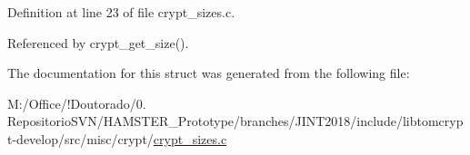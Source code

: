 Definition at line 23 of file crypt\+\_\+sizes.\+c.



Referenced by crypt\+\_\+get\+\_\+size().



The documentation for this struct was generated from the following file\+:\begin{DoxyCompactItemize}
\item 
M\+:/\+Office/!\+Doutorado/0. Repositorio\+S\+V\+N/\+H\+A\+M\+S\+T\+E\+R\+\_\+\+Prototype/branches/\+J\+I\+N\+T2018/include/libtomcrypt-\/develop/src/misc/crypt/\mbox{\hyperlink{crypt__sizes_8c}{crypt\+\_\+sizes.\+c}}\end{DoxyCompactItemize}
